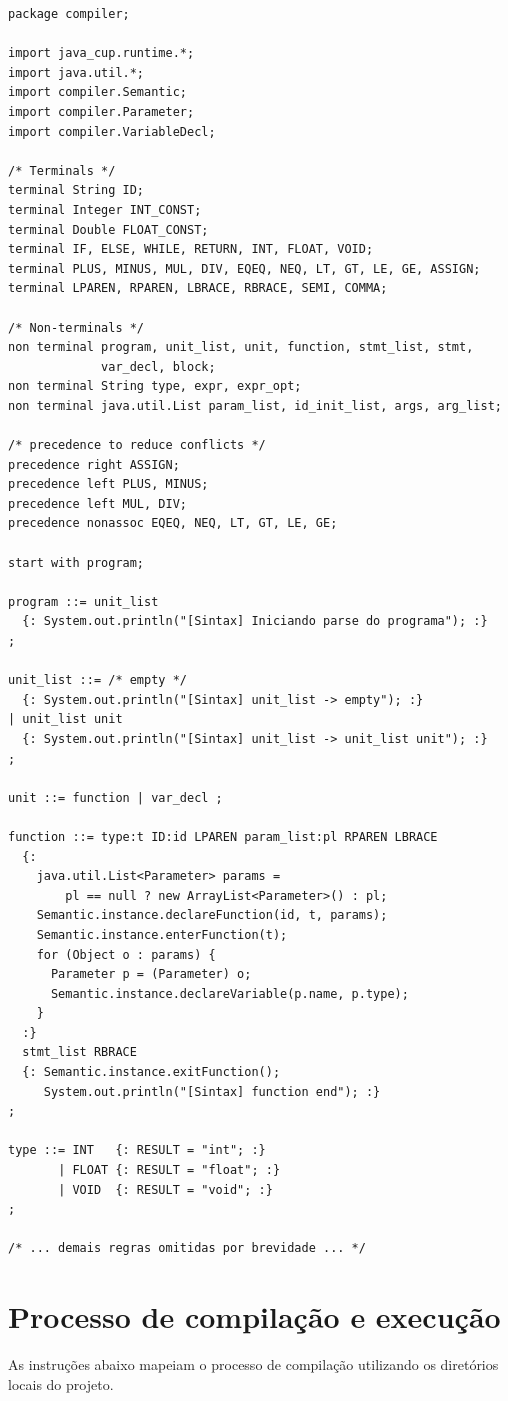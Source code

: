 \documentclass[a4paper,12pt]{article}
\begin{document}
\begin{verbatim}
package compiler;

import java_cup.runtime.*;
import java.util.*;
import compiler.Semantic;
import compiler.Parameter;
import compiler.VariableDecl;

/* Terminals */
terminal String ID;
terminal Integer INT_CONST;
terminal Double FLOAT_CONST;
terminal IF, ELSE, WHILE, RETURN, INT, FLOAT, VOID;
terminal PLUS, MINUS, MUL, DIV, EQEQ, NEQ, LT, GT, LE, GE, ASSIGN;
terminal LPAREN, RPAREN, LBRACE, RBRACE, SEMI, COMMA;

/* Non-terminals */
non terminal program, unit_list, unit, function, stmt_list, stmt,
             var_decl, block;
non terminal String type, expr, expr_opt;
non terminal java.util.List param_list, id_init_list, args, arg_list;

/* precedence to reduce conflicts */
precedence right ASSIGN;
precedence left PLUS, MINUS;
precedence left MUL, DIV;
precedence nonassoc EQEQ, NEQ, LT, GT, LE, GE;

start with program;

program ::= unit_list
  {: System.out.println("[Sintax] Iniciando parse do programa"); :}
;

unit_list ::= /* empty */
  {: System.out.println("[Sintax] unit_list -> empty"); :}
| unit_list unit
  {: System.out.println("[Sintax] unit_list -> unit_list unit"); :}
;

unit ::= function | var_decl ;

function ::= type:t ID:id LPAREN param_list:pl RPAREN LBRACE
  {:
    java.util.List<Parameter> params =
        pl == null ? new ArrayList<Parameter>() : pl;
    Semantic.instance.declareFunction(id, t, params);
    Semantic.instance.enterFunction(t);
    for (Object o : params) {
      Parameter p = (Parameter) o;
      Semantic.instance.declareVariable(p.name, p.type);
    }
  :}
  stmt_list RBRACE
  {: Semantic.instance.exitFunction();
     System.out.println("[Sintax] function end"); :}
;

type ::= INT   {: RESULT = "int"; :}
       | FLOAT {: RESULT = "float"; :}
       | VOID  {: RESULT = "void"; :}
;

/* ... demais regras omitidas por brevidade ... */
\end{verbatim}

\section{Processo de compilação e execução}
As instruções abaixo mapeiam o processo de compilação utilizando os diretórios locais do projeto.
\end{document}
